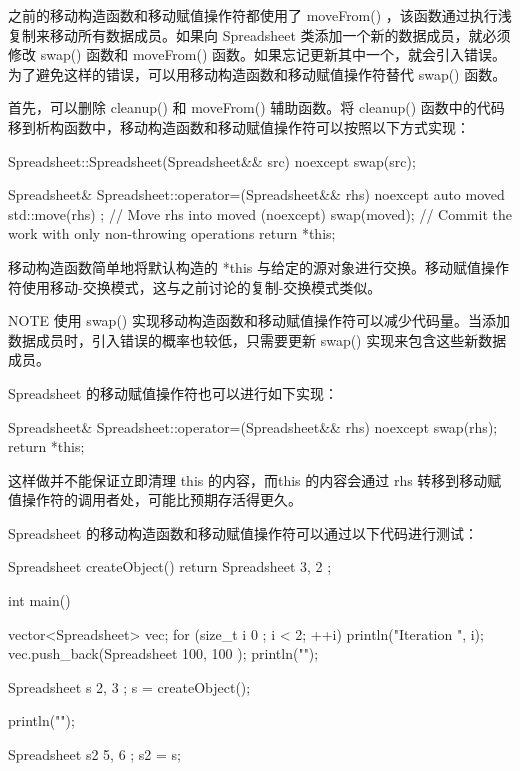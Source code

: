 
之前的移动构造函数和移动赋值操作符都使用了 moveFrom() ，该函数通过执行浅复制来移动所有数据成员。如果向 Spreadsheet 类添加一个新的数据成员，就必须修改 swap() 函数和 moveFrom() 函数。如果忘记更新其中一个，就会引入错误。为了避免这样的错误，可以用移动构造函数和移动赋值操作符替代 swap() 函数。

首先，可以删除 cleanup() 和 moveFrom() 辅助函数。将 cleanup() 函数中的代码移到析构函数中，移动构造函数和移动赋值操作符可以按照以下方式实现：

\begin{cpp}
Spreadsheet::Spreadsheet(Spreadsheet&& src) noexcept
{
    swap(src);
}

Spreadsheet& Spreadsheet::operator=(Spreadsheet&& rhs) noexcept
{
    auto moved { std::move(rhs) }; // Move rhs into moved (noexcept)
    swap(moved); // Commit the work with only non-throwing operations
    return *this;
}
\end{cpp}

移动构造函数简单地将默认构造的 *this 与给定的源对象进行交换。移动赋值操作符使用移动-交换模式，这与之前讨论的复制-交换模式类似。

\begin{myNotic}{NOTE}
使用 swap() 实现移动构造函数和移动赋值操作符可以减少代码量。当添加数据成员时，引入错误的概率也较低，只需要更新 swap() 实现来包含这些新数据成员。
\end{myNotic}

Spreadsheet 的移动赋值操作符也可以进行如下实现：

\begin{cpp}
Spreadsheet& Spreadsheet::operator=(Spreadsheet&& rhs) noexcept
{
    swap(rhs);
    return *this;
}
\end{cpp}

这样做并不能保证立即清理 this 的内容，而this 的内容会通过 rhs 转移到移动赋值操作符的调用者处，可能比预期存活得更久。


Spreadsheet 的移动构造函数和移动赋值操作符可以通过以下代码进行测试：

\begin{cpp}
Spreadsheet createObject()
{
    return Spreadsheet { 3, 2 };
}

int main()
{
    vector<Spreadsheet> vec;
    for (size_t i { 0 }; i < 2; ++i) {
        println("Iteration {}", i);
        vec.push_back(Spreadsheet { 100, 100 });
        println("");
    }

    Spreadsheet s { 2, 3 };
    s = createObject();

    println("");

    Spreadsheet s2 { 5, 6 };
    s2 = s;
}
\end{cpp}

